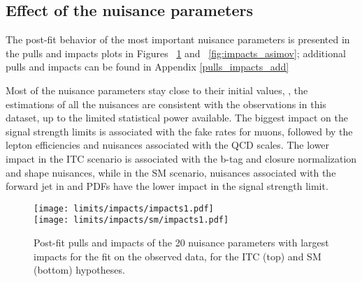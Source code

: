 \subsection{Effect of the nuisance parameters}

The post-fit behavior of the most important nuisance parameters is presented in the pulls and impacts plots in Figures ~\ref{fig:impacts} and ~\ref{fig:impacts_asimov}; additional pulls and impacts can be found in Appendix \ref{pulls_impacts_add} 

Most of the nuisance parameters stay close to their initial values, \ie, the estimations of all the nuisances are consistent with the observations in this dataset, up to the limited statistical power available. The biggest impact on the signal strength limits is associated with the fake rates for muons, followed by the lepton efficiencies and nuisances associated with the QCD scales. The lower impact in the ITC scenario is associated with the b-tag and \tHq closure normalization and shape nuisances, while in the SM scenario, nuisances associated with the forward jet in \tHq and PDFs have the lower impact in the signal strength limit.

\begin{figure} [!th]
 \centering
 \texttt{[image: limits/impacts/impacts1.pdf]}\\
 \texttt{[image: limits/impacts/sm/impacts1.pdf]}\\        
\caption[Post-fit pulls and impacts.]{Post-fit pulls and impacts of the 20 nuisance parameters with largest impacts for the fit on the observed data, for the ITC (top) and SM (bottom) hypotheses.}
\label{fig:impacts}
\end{figure}


